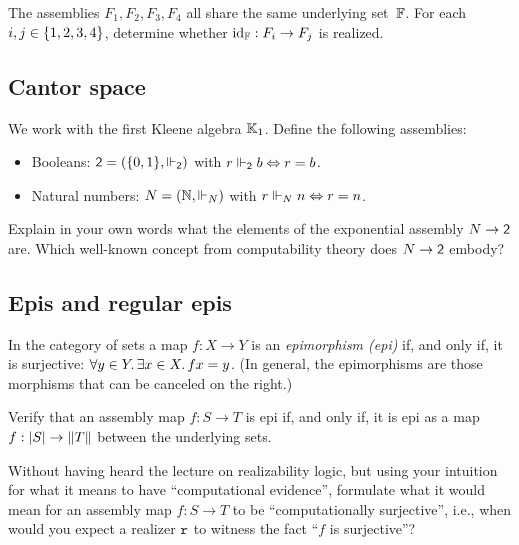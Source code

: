 \documentclass{article}
\begin{document}
The assemblies $F_1, F_2, F_3, F_4$ all share the same underlying set~$\FF$. For each $i, j \in \set{1, 2, 3, 4}$, determine whether $\id[\FF] : F_i \to F_j$ is realized.

\subsection{Cantor space}
\label{sec:cantor-space}

We work with the first Kleene algebra $\klone$. Define the following assemblies:
%
\begin{itemize}
\item Booleans: $\two = (\set{0,1}, {\rz[\two]})$ with $r \rz[\two] b \liff r = b$.
\item Natural numbers: $N = (\NN, {\rz[N]})$ with $r \rz[N] n \liff r = n$.
\end{itemize}
%
Explain in your own words what the elements of the exponential assembly $N \to \two$ are. Which well-known concept from computability theory does $N \to \two$ embody?


\subsection{Epis and regular epis}
\label{sec:epis-regular-epis}

In the category of sets a map $f : X \to Y$ is an \emph{epimorphism (epi)} if, and only if, it is surjective: $\all{y \in Y} \some{x \in X} f x = y$. (In general, the epimorphisms are those morphisms that can be canceled on the right.)

Verify that an assembly map $f : S \to T$ is epi if, and only if, it is epi as a map $f : \S{S} \to \T{T}$ between the underlying sets.

Without having heard the lecture on realizability logic, but using your intuition for what it means to have ``computational evidence'', formulate what it would mean for an assembly map $f : S \to T$ to be ``computationally surjective'', i.e., when would you expect a realizer $\R{r}$ to witness the fact ``$f$ is surjective''?
\end{document}
